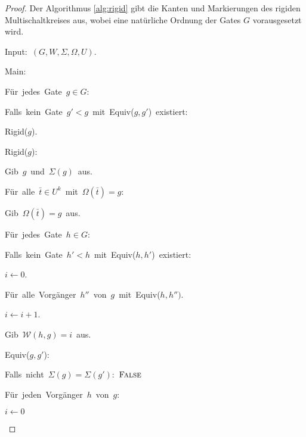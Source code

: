 \begin{proof}
Der Algorithmus \ref{alg:rigid} gibt die Kanten und Markierungen
des rigiden Multischaltkreises aus, wobei eine natürliche Ordnung
der Gates $G$ vorausgesetzt wird.

\begin{algorithm}
\begin{lyxcode}
Input:~$\left(G,W,\Sigma,\Omega,U\right)$.

Main:~

\begin{lyxcode}
Für~jedes~Gate~$g\in G$:~

\begin{lyxcode}
Falls~kein~Gate~$g'<g$~mit~Equiv($g,g'$)~existiert:~

\begin{lyxcode}
Rigid($g$).
\end{lyxcode}
\end{lyxcode}
\end{lyxcode}
Rigid($g$):~

\begin{lyxcode}
Gib~$g$~und~$\Sigma\left(g\right)$~aus.

Für~alle~$\bar{t}\in U^{k}$~mit~$\Omega\left(\bar{t}\right)=g$:~

\begin{lyxcode}
Gib~$\Omega\left(\bar{t}\right)=g$~aus.
\end{lyxcode}
Für~jedes~Gate~$h\in G$:~

\begin{lyxcode}
Falls~kein~Gate~$h'<h$~mit~Equiv($h,h'$)~existiert:~

\begin{lyxcode}
$i\leftarrow0$.

Für~alle~Vorgänger~$h''$~von~$g$~mit~Equiv($h,h'')$.~

\begin{lyxcode}
$i\leftarrow i+1$.
\end{lyxcode}
Gib~$\mathcal{W}\left(h,g\right)=i$~aus.
\end{lyxcode}
\end{lyxcode}
\end{lyxcode}
Equiv($g,g'$):~

\begin{lyxcode}
Falls~nicht~$\Sigma\left(g\right)=\Sigma\left(g'\right)$:~$\textsc{False}$

Für~jeden~Vorgänger~$h$~von~$g$:~

\begin{lyxcode}
$i\leftarrow0$


\end{lyxcode}
\end{lyxcode}
\end{lyxcode}
\end{algorithm}
\end{proof}
